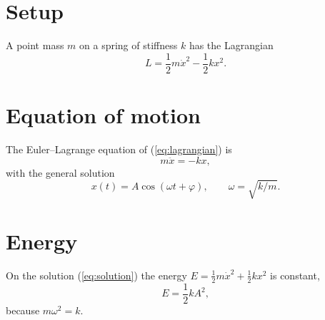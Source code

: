 \documentclass{article}
\begin{document}
\section{Setup}
\label{sec:setup}
A point mass $m$ on a spring of stiffness $k$ has the Lagrangian
\begin{equation}
\label{eq:lagrangian}
L = \frac{1}{2} m \dot{x}^2 - \frac{1}{2} k x^2 .
\end{equation}

\section{Equation of motion}
\label{sec:motion}
The Euler--Lagrange equation of (\ref{eq:lagrangian}) is
\begin{equation}
\label{eq:motion}
m \ddot{x} = - k x ,
\end{equation}
with the general solution
\begin{equation}
\label{eq:solution}
x(t) = A \cos(\omega t + \varphi), \qquad \omega = \sqrt{k/m} .
\end{equation}

\section{Energy}
\label{sec:energy}
On the solution (\ref{eq:solution}) the energy
$E = \frac{1}{2} m \dot{x}^2 + \frac{1}{2} k x^2$ is constant,
\begin{equation}
\label{eq:energy}
E = \frac{1}{2} k A^2 ,
\end{equation}
because $m \omega^2 = k$.
\end{document}
